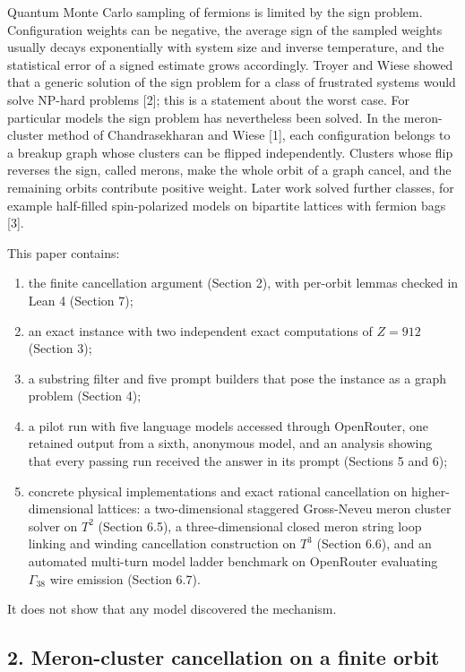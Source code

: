 \documentclass[
  11pt,
]{article}
\providecommand{\tightlist}{%
  \setlength{\itemsep}{0pt}\setlength{\parskip}{0pt}}
\begin{document}
Quantum Monte Carlo sampling of fermions is limited by the sign problem.
Configuration weights can be negative, the average sign of the sampled
weights usually decays exponentially with system size and inverse
temperature, and the statistical error of a signed estimate grows
accordingly. Troyer and Wiese showed that a generic solution of the sign
problem for a class of frustrated systems would solve NP-hard problems
{[}2{]}; this is a statement about the worst case. For particular models
the sign problem has nevertheless been solved. In the meron-cluster
method of Chandrasekharan and Wiese {[}1{]}, each configuration belongs
to a breakup graph whose clusters can be flipped independently. Clusters
whose flip reverses the sign, called merons, make the whole orbit of a
graph cancel, and the remaining orbits contribute positive weight. Later
work solved further classes, for example half-filled spin-polarized
models on bipartite lattices with fermion bags {[}3{]}.

This paper contains:

\begin{enumerate}
\def\labelenumi{\arabic{enumi}.}
\tightlist
\item
  the finite cancellation argument (Section 2), with per-orbit lemmas
  checked in Lean 4 (Section 7);
\item
  an exact instance with two independent exact computations of
  \(Z = 912\) (Section 3);
\item
  a substring filter and five prompt builders that pose the instance as
  a graph problem (Section 4);
\item
  a pilot run with five language models accessed through OpenRouter, one
  retained output from a sixth, anonymous model, and an analysis showing
  that every passing run received the answer in its prompt (Sections 5
  and 6);
\item
  concrete physical implementations and exact rational cancellation on
  higher-dimensional lattices: a two-dimensional staggered Gross-Neveu
  meron cluster solver on \(T^2\) (Section 6.5), a three-dimensional
  closed meron string loop linking and winding cancellation construction
  on \(T^3\) (Section 6.6), and an automated multi-turn model ladder
  benchmark on OpenRouter evaluating \(\Gamma_{38}\) wire emission
  (Section 6.7).
\end{enumerate}

It does not show that any model discovered the mechanism.

\subsection{2. Meron-cluster cancellation on a finite
orbit}\label{meron-cluster-cancellation-on-a-finite-orbit}
\end{document}
